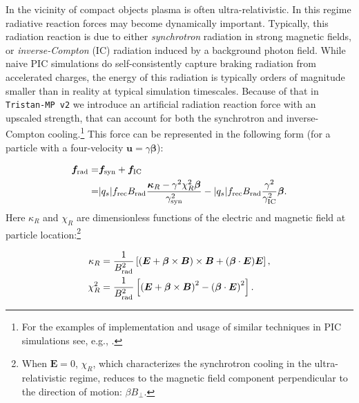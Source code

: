 In the vicinity of compact objects plasma is often ultra-relativistic. In this regime radiative reaction forces may become dynamically important. Typically, this radiation reaction is due to either \emph{synchrotron} radiation in strong magnetic fields, or \emph{inverse-Compton} (IC) radiation induced by a background photon field. While naive PIC simulations do self-consistently capture braking radiation from accelerated charges, the energy of this radiation is typically orders of magnitude smaller than in reality at typical simulation timescales. Because of that in \texttt{Tristan-MP v2} we introduce an artificial radiation reaction force with an upscaled strength, that can account for both the synchrotron and inverse-Compton cooling.\footnote{For the examples of implementation and usage of similar techniques in PIC simulations see, e.g., \cite{2010NJPh...12l3005T, 2016CoPhC.204..141V, 2016ApJ...828...92Y, 2019ApJ...877...53H, 2019MNRAS.482L..60W, 2020arXiv201203043N}.} This force can be represented in the following form (for a particle with a four-velocity $\bm{u}=\gamma\bm{\beta}$):

\begin{equation}
\begin{split}
\label{eq:num-radiation}
    \bm{f}_{\rm rad} =& \bm{f}_{\rm syn} + \bm{f}_{\rm IC}\\
    =&|q_s| f_{\rm rec} B_{\rm rad}\frac{\bm{\kappa}_R - \gamma^2\chi_R^2 \bm{\beta}}{\gamma_{\rm syn}^2}-|q_s| f_{\rm rec} B_{\rm rad}\frac{\gamma^2}{\gamma_{\rm IC}^2}\bm{\beta}.
\end{split}
\end{equation}
\noindent Here $\kappa_R$ and $\chi_R$ are dimensionless functions of the electric and magnetic field at particle location:\footnote{When $\bm{E}=0$, $\chi_R$, which characterizes the synchrotron cooling in the ultra-relativistic regime, reduces to the magnetic field component perpendicular to the direction of motion: $\beta B_\perp$.}

\begin{equation}
    \begin{aligned}
    \label{eq:num-kappa-chi}
        \kappa_R &= \frac{1}{B_{\rm rad}^2}\left[\left(\bm{E} + \bm{\beta}\times\bm{B}\right)\times\bm{B} + (\bm{\beta}\cdot\bm{E})\bm{E}\right],\\
        \chi_R^2 &= \frac{1}{B_{\rm rad}^2}\left[\left(\bm{E} + \bm{\beta}\times\bm{B}\right)^2 - \left(\bm{\beta}\cdot\bm{E}\right)^2\right].
    \end{aligned}
\end{equation}


